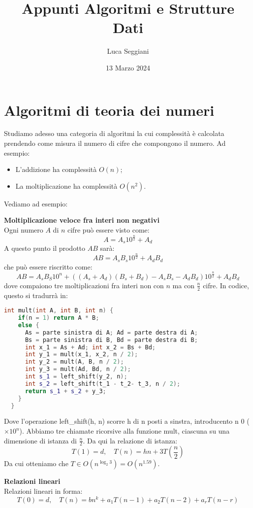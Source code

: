 \documentclass[a4paper,12pt]{article}
\title{Appunti Algoritmi e Strutture Dati}
\author{Luca Seggiani}
\date{13 Marzo 2024}
\begin{document}
\maketitle
\section{Algoritmi di teoria dei numeri}
Studiamo adesso una categoria di algoritmi la cui complessità è calcolata prendendo come misura il numero di cifre che compongono il numero. Ad esempio:
\begin{itemize}
  \item L'addizione ha complessità $O(n)$;
  \item La moltiplicazione ha complessità $O(n^2)$.

\end{itemize}
Vediamo ad esempio:
\par\smallskip
\textbf{Moltiplicazione veloce fra interi non negativi} \\
Ogni numero $A$ di $n$ cifre può essere visto come:
$$ A = A_s10^{\frac{n}{2}} + A_d $$
A questo punto il prodotto $AB$ sarà:
$$ AB= A_sB_s 10^{\frac{n}{2}} + A_dB_d $$
che può essere riscritto come:
$$AB = A_sB_S 10^n + ((A_s+A_d)(B_s + B_d) - A_sB_s - A_dB_d)10^{\frac{n}{2}}+A_dB_d $$
dove compaiono tre moltiplicazioni fra interi non con $n$ ma con $\frac{n}{2}$ cifre.
In codice, questo si tradurrà in:
\begin{lstlisting}[language=C++]
  int mult(int A, int B, int n) {
    if(n = 1) return A * B;
    else {
      As = parte sinistra di A; Ad = parte destra di A;
      Bs = parte sinistra di B, Bd = parte destra di B;
      int x_1 = As + Ad; int x_2 = Bs + Bd;
      int y_1 = mult(x_1, x_2, n / 2);
      int y_2 = mult(A, B, n / 2);
      int y_3 = mult(Ad, Bd, n / 2);
      int s_1 = left_shift(y_2, n);
      int s_2 = left_shift(t_1 - t_2- t_3, n / 2);
      return s_1 + s_2 + y_3;
    }
  }
\end{lstlisting}
Dove l'operazione left\_shift(h, n) scorre h di n posti a sinstra, introducento n 0 ($\times 10^n$). Abbiamo tre
chiamate ricorsive alla funzione mult, ciascuna su una dimensione di istanza di $\frac{n}{2}$. Da qui la relazione di istanza:
$$ T(1) = d, \quad T(n) = hn + 3T(\frac{n}{2}) $$
Da cui otteniamo che $ T \in O(n^{\log_2{3}}) = O(n^{1.59})$.
\par\smallskip
\textbf{Relazioni lineari} \\
Relazioni lineari in forma:
$$ T(0) = d, \quad T(n) = bn^k + a_1T(n-1)+a_2T(n-2)+a_rT(n-r) $$
\end{document}
